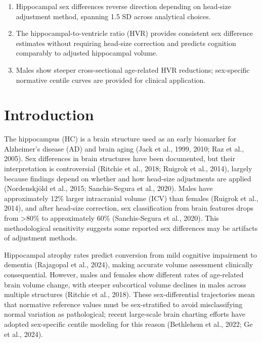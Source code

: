 \documentclass[
]{article}
\providecommand{\tightlist}{%
  \setlength{\itemsep}{0pt}\setlength{\parskip}{0pt}}
\begin{document}
\begin{enumerate}
\def\labelenumi{\arabic{enumi}.}
\tightlist
\item
  Hippocampal sex differences reverse direction depending on head-size
  adjustment method, spanning 1.5 SD across analytical choices.
\item
  The hippocampal-to-ventricle ratio (HVR) provides consistent sex
  difference estimates without requiring head-size correction and
  predicts cognition comparably to adjusted hippocampal volume.
\item
  Males show steeper cross-sectional age-related HVR reductions;
  sex-specific normative centile curves are provided for clinical
  application.
\end{enumerate}

\section{Introduction}\label{introduction}

The hippocampus (HC) is a brain structure used as an early biomarker for
Alzheimer's disease (AD) and brain aging (Jack et al., 1999, 2010; Raz
et al., 2005). Sex differences in brain structures have been documented,
but their interpretation is controversial (Ritchie et al., 2018; Ruigrok
et al., 2014), largely because findings depend on whether and how
head-size adjustments are applied (Nordenskjöld et al., 2015;
Sanchis-Segura et al., 2020). Males have approximately 12\% larger
intracranial volume (ICV) than females (Ruigrok et al., 2014), and after
head-size correction, sex classification from brain features drops from
\textgreater80\% to approximately 60\% (Sanchis-Segura et al., 2020).
This methodological sensitivity suggests some reported sex differences
may be artifacts of adjustment methods.

Hippocampal atrophy rates predict conversion from mild cognitive
impairment to dementia (Rajagopal et al., 2024), making accurate volume
assessment clinically consequential. However, males and females show
different rates of age-related brain volume change, with steeper
subcortical volume declines in males across multiple structures (Ritchie
et al., 2018). These sex-differential trajectories mean that normative
reference values must be sex-stratified to avoid misclassifying normal
variation as pathological; recent large-scale brain charting efforts
have adopted sex-specific centile modeling for this reason (Bethlehem et
al., 2022; Ge et al., 2024).
\end{document}
